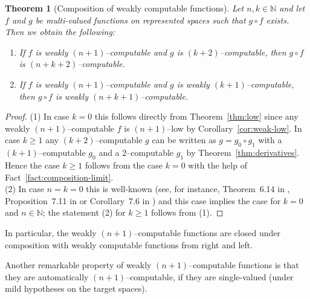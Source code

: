 \documentclass[a4paper]{amsart}
\def\IN{{\mathbb{N}}}
\newtheorem{theorem}{Theorem}[section]
\theoremstyle{definition}
\begin{document}
\begin{theorem}[Composition of weakly computable functions]
\label{thm:weakly-computable-composition}
Let $n,k\in\IN$ and let $f$ and $g$ be multi-valued functions on represented spaces
such that $g\circ f$ exists. Then we obtain the following:
\begin{enumerate}
\item If $f$ is weakly $(n+1)$--computable and $g$ is $(k+2)$--computable, then 
         $g\circ f$ is $(n+k+2)$--computable. 
\item If $f$ is weakly $(n+1)$--computable and $g$ is weakly $(k+1)$--computable, then
         $g\circ f$ is weakly $(n+k+1)$--computable.
\end{enumerate}
\end{theorem}
\begin{proof}
(1) In case $k=0$ this follows directly from Theorem~\ref{thm:low} since any weakly $(n+1)$--computable
$f$ is $(n+1)$--low by Corollary~\ref{cor:weak-low}. In case $k\geq 1$ any $(k+2)$--computable $g$ can be
written as $g=g_0\circ g_1$ with a $(k+1)$--computable $g_0$ and a $2$--computable $g_1$ by Theorem~\ref{thm:derivatives}.
Hence the case $k\geq1$ follows from the case $k=0$ with the help of Fact~\ref{fact:composition-limit}.\\
(2) In case $n=k=0$ this is well-known (see, for instance, Theorem~6.14 in \cite{GM09}, 
Proposition~7.11 in \cite{BG11} or Corollary~7.6 in \cite{BBP}) and this case implies the case for $k=0$ and $n\in\IN$;
the statement (2) for $k\geq 1$ follows from (1).
\end{proof}

In particular, the weakly $(n+1)$--computable functions are closed under composition with 
weakly computable functions from right and left.

Another remarkable property of weakly $(n+1)$--computable functions is that
they are automatically $(n+1)$--computable, if they are single-valued (under mild hypotheses on the target spaces).
\end{document}

